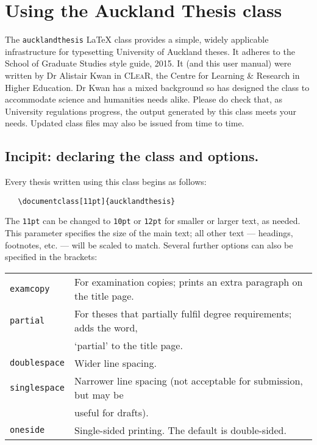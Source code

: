 \chapter{Using the Auckland Thesis class}
%
%

The \texttt{aucklandthesis} LaTeX class provides a simple, widely applicable infrastructure for typesetting University of Auckland theses. It adheres to the School of Graduate Studies style guide, 2015. It (and this user manual) were written by Dr Alistair Kwan in \textsc{CLeaR}, the Centre for Learning \& Research in Higher Education. Dr Kwan has a mixed background so has designed the class to accommodate science and humanities needs alike. Please do check that, as University regulations progress, the output generated by this class meets your needs. Updated class files may also be issued from time to time.

\section{Incipit: declaring the class and options.}
Every thesis written using this class begins as follows:

\begin{verbatim}
   \documentclass[11pt]{aucklandthesis}
\end{verbatim}

The \verb+11pt+ can be changed to \verb+10pt+ or \verb+12pt+ for smaller or larger text, as needed. This parameter specifies the size of the main text; all other text — headings, footnotes, etc. — will be scaled to match. Several further options can also be specified in the brackets:

\smallskip
\noindent
\begin{tabular}{ll}
\verb+examcopy+ & For examination copies; prints an extra paragraph on the title page. \\
\verb+partial+ & For theses that partially fulfil degree requirements; adds the word, \\
	& `partial' to the title page.\\
\verb+doublespace+ & Wider line spacing.\\
\verb+singlespace+ & Narrower line spacing (not acceptable for submission, but may be \\
	& useful for drafts).\\
\verb+oneside+ & Single-sided printing. The default is double-sided.\\
\end{tabular}


